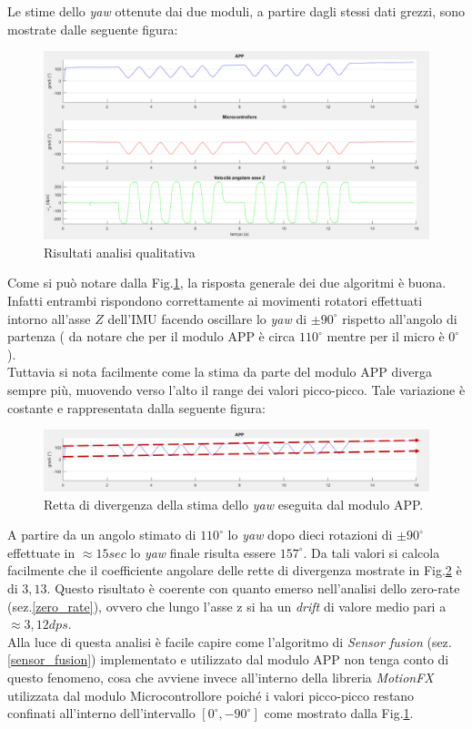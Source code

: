 Le stime dello \textit{yaw} ottenute dai due moduli, a partire dagli stessi dati grezzi, sono mostrate dalle seguente figura:
\begin{figure}
	\includegraphics[width=\textwidth]{analisi/analisiQualitativa.png}
	\caption{Risultati analisi qualitativa}
	\label{fig:analisiQualitativa}
\end{figure}
\newpage
Come si può notare dalla Fig.\ref{fig:analisiQualitativa}, la risposta generale dei due algoritmi è buona. Infatti entrambi rispondono correttamente ai movimenti rotatori effettuati intorno all'asse $Z$ dell'IMU facendo oscillare lo \textit{yaw} di $\pm 90^{\circ}$ rispetto all'angolo di partenza ( da notare che per il modulo APP è circa  $ 110^{\circ}$ mentre per il micro è  $0^{\circ}$ ).\\
Tuttavia si nota facilmente come la stima da parte del modulo APP diverga sempre più, muovendo verso l'alto il range dei valori picco-picco. Tale variazione è costante e rappresentata dalla seguente figura:
\begin{figure}[H]  
	\centering 
	\includegraphics[scale=0.35]{analisi/analisiQualitativaApp.png}
	\caption{Retta di divergenza della stima dello \textit{yaw} eseguita dal modulo APP.}
	\label{fig:analisiQualitativaApp}
\end{figure}
A partire da un angolo stimato di $ 110^{\circ}$ lo \textit{yaw} dopo dieci rotazioni di $\pm 90^{\circ}$ effettuate in $\approx 15 sec$ lo \textit{yaw} finale risulta essere  $ 157^{\circ}$. Da tali valori si calcola facilmente che il coefficiente angolare delle rette di divergenza mostrate in Fig.\ref{fig:analisiQualitativaApp} è di $3,13$. Questo risultato è coerente con quanto emerso nell'analisi dello zero-rate (sez.\ref{zero_rate}), ovvero che lungo l'asse z si ha un \textit{drift} di valore medio pari a $\approx 3,12 dps$.\\
Alla luce di questa analisi è facile capire come l'algoritmo di \textit{Sensor fusion} (sez.\ref{sensor_fusion}) implementato e utilizzato dal modulo APP non tenga conto di questo fenomeno, cosa che avviene invece all'interno della libreria \textit{MotionFX} utilizzata dal modulo Microcontrollore poiché i valori picco-picco restano confinati all'interno dell'intervallo $[0^{\circ},-90^{\circ}]$ come mostrato dalla Fig.\ref{fig:analisiQualitativa}.




